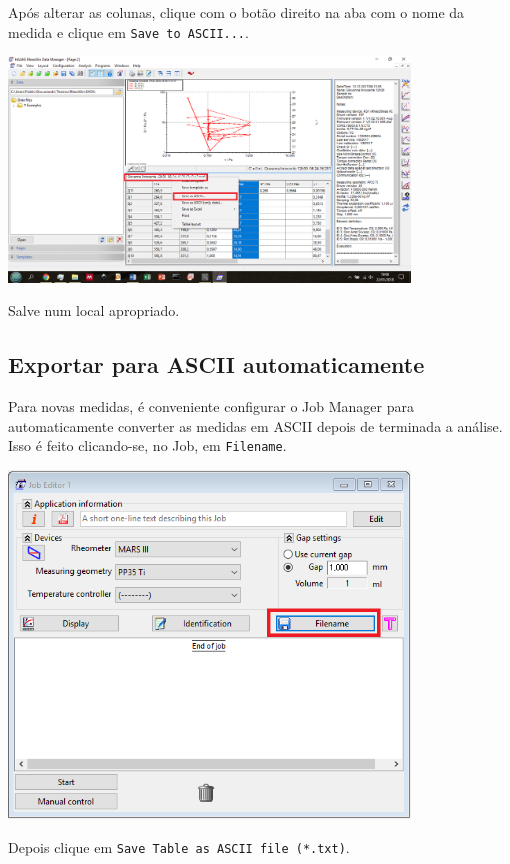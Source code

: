 \documentclass[a4paper, 12pt]{article}
\begin{document}
Após alterar as colunas, clique com o botão direito na aba com o nome da medida e clique em \texttt{Save to ASCII...}.

\begin{center}
\includegraphics[width=0.8\textwidth]{DataMan3} 
\end{center}

Salve num local apropriado.

\subsection{Exportar para ASCII automaticamente}

Para novas medidas, é conveniente configurar o Job Manager para automaticamente converter as medidas em ASCII depois de terminada a análise. Isso é feito clicando-se, no Job, em \texttt{Filename}.

\begin{center}
\includegraphics[width = 0.8\textwidth]{JobMan1}
\end{center}

Depois clique em \texttt{Save Table as ASCII file (*.txt)}.
\end{document}
